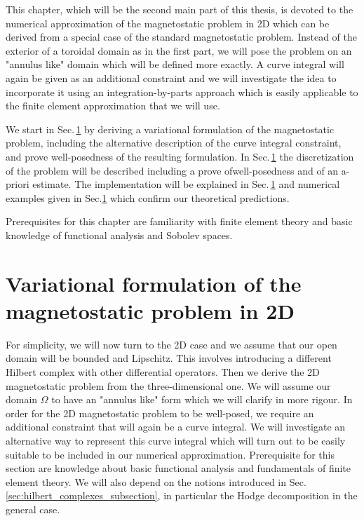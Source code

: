 \documentclass[../master_thesis.tex]{subfiles}
\begin{document}
This chapter, which will be the second main part of this thesis, is devoted 
to the numerical approximation of the magnetostatic problem in 2D which can 
be derived from a special case of the standard magnetostatic problem. 
Instead of the exterior of a toroidal domain as in the first part, we 
will pose the problem on an "annulus like" domain which will be defined more exactly. 
A curve integral will again be given as an additional constraint and we will 
investigate the idea to incorporate it using an integration-by-parts approach 
which is easily applicable to the finite element approximation that we will use. 

We start in Sec.\,\ref{} by deriving a variational formulation of the magnetostatic problem, 
including the alternative description of the curve integral constraint,
and prove well-posedness of the resulting formulation. In Sec.\,\ref{} the discretization 
of the problem will be described including a prove ofwell-posedness and of an a-priori
estimate. The implementation will be explained in Sec.\,\ref{} and numerical examples 
given in Sec.\ref{} which confirm our theoretical predictions.

Prerequisites for this chapter are familiarity with finite element theory and 
basic knowledge of functional analysis and Sobolev spaces. 

\section{Variational formulation of the magnetostatic problem in 2D} 

For simplicity, we will now turn to the 2D case and we assume that 
our open domain will be bounded and Lipschitz. This involves introducing
a different Hilbert complex with other differential operators. Then we 
derive the 2D magnetostatic problem from the three-dimensional one. 
We will assume our domain $\Omega$ to have an "annulus like" form which we 
will clarify in more rigour. In order for the 2D magnetostatic problem to be well-posed, 
we require an additional constraint that will again be a curve integral. 
We will investigate an alternative way to represent this curve integral 
which will turn out to be easily suitable to be included in our numerical 
approximation. Prerequisite for this section are knowledge about basic functional analysis 
and fundamentals of finite element theory. We will also depend on the 
notions introduced in Sec.\,\ref{sec:hilbert_complexes_subsection}, in particular the Hodge decomposition in the general 
case.
\end{document}
